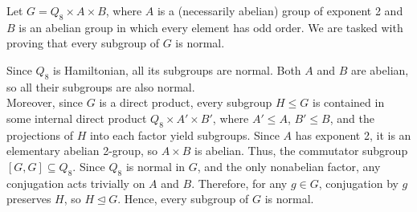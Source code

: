 \documentclass{article}
\begin{document}
\begin{solution}[Exercise 4.28]
    Let $G = Q_8 \times A \times B$, where $A$ is a (necessarily abelian) group of exponent 2 and $B$ is an abelian group in which every element has odd order. We are tasked with proving that every subgroup of $G$ is normal.

    Since $Q_8$ is Hamiltonian, all its subgroups are normal. Both $A$ and $B$ are abelian, so all their subgroups are also normal.\\

    Moreover, since $G$ is a direct product, every subgroup $H \le G$ is contained in some internal direct product $Q_8 \times A' \times B'$, where $A' \le A$, $B' \le B$, and the projections of $H$ into each factor yield subgroups. Since $A$ has exponent 2, it is an elementary abelian 2-group, so $A \times B$ is abelian. Thus, the commutator subgroup $[G, G] \subseteq Q_8$. Since $Q_8$ is normal in $G$, and the only nonabelian factor, any conjugation acts trivially on $A$ and $B$. Therefore, for any $g \in G$, conjugation by $g$ preserves $H$, so $H \trianglelefteq G$. Hence, every subgroup of $G$ is normal.
\end{solution}
\end{document}
